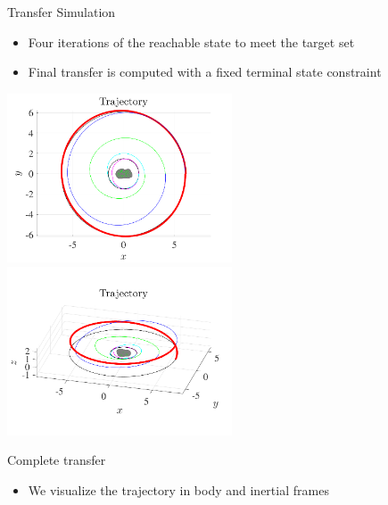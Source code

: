 \begin{frame}{Transfer Simulation}
    \begin{itemize}
        \item Four iterations of the reachable state to meet the target set
        \item Final transfer is computed with a fixed terminal state constraint
    \end{itemize}

    \begin{center}
        \includegraphics[width=0.5\textwidth,height=0.7\textheight,keepaspectratio]{figures/2016AAS/trajectory.pdf}~
        \includegraphics[width=0.5\textwidth,height=0.7\textheight,keepaspectratio]{figures/2016AAS/trajectory_3d.pdf}
    \end{center}

\end{frame}

\begin{frame}{Complete transfer}
\begin{itemize}
    \item We visualize the trajectory in body and inertial frames
\end{itemize}

\begin{center}
  ~\hfill
\end{center}

\end{frame}

